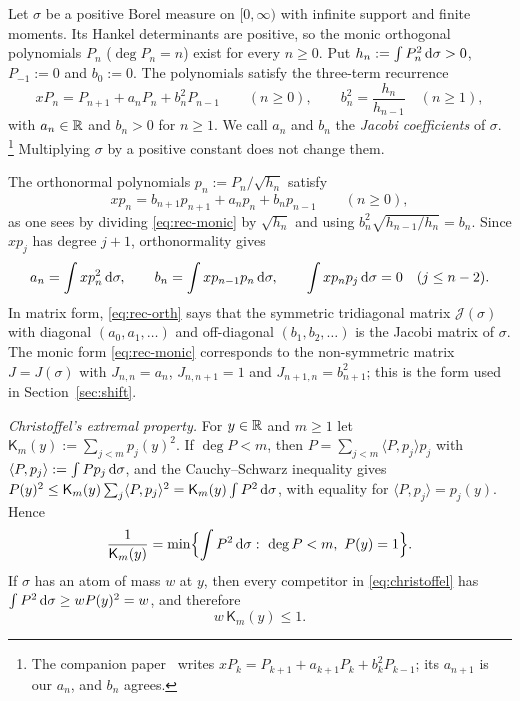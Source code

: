 Let $\sigma$ be a positive Borel measure on $[0,\infty)$ with infinite support and finite moments. Its Hankel
determinants are positive, so the monic orthogonal polynomials $P_n$ ($\deg P_n=n$) exist for every $n\ge0$. Put
$h_n:=\int P_n^2\,\mathrm{d}\sigma>0$, $P_{-1}:=0$ and $b_0:=0$. The polynomials satisfy the three-term recurrence
\begin{equation}\label{eq:rec-monic}
  xP_n=P_{n+1}+a_nP_n+b_n^2P_{n-1}\qquad(n\ge0),\qquad b_n^2=\frac{h_n}{h_{n-1}}\quad(n\ge1),
\end{equation}
with $a_n\in\mathbb{R}$ and $b_n>0$ for $n\ge1$. We call $a_n$ and $b_n$ the \emph{Jacobi coefficients} of $\sigma$.%
\footnote{The companion paper~\cite{Paper1} writes $xP_k=P_{k+1}+a_{k+1}P_k+b_k^2P_{k-1}$; its $a_{n+1}$ is our $a_n$, and $b_n$
agrees.}
Multiplying $\sigma$ by a positive constant does not change them.

The orthonormal polynomials $p_n:=P_n/\sqrt{h_n}$ satisfy
\begin{equation}\label{eq:rec-orth}
  xp_n=b_{n+1}p_{n+1}+a_np_n+b_np_{n-1}\qquad(n\ge0),
\end{equation}
as one sees by dividing \eqref{eq:rec-monic} by $\sqrt{h_n}$ and using $b_n^2\sqrt{h_{n-1}/h_n}=b_n$. Since $xp_j$ has
degree $j+1$, orthonormality gives
\begin{equation}\label{eq:coef-int}
  a_n=\int xp_n^2\,\mathrm{d}\sigma,\qquad b_n=\int xp_{n-1}p_n\,\mathrm{d}\sigma,\qquad \int xp_np_j\,\mathrm{d}\sigma=0\quad(j\le n-2).
\end{equation}
In matrix form, \eqref{eq:rec-orth} says that the symmetric tridiagonal matrix $\mathcal J(\sigma)$ with diagonal
$(a_0,a_1,\dots)$ and off-diagonal $(b_1,b_2,\dots)$ is the Jacobi matrix of $\sigma$. The monic form
\eqref{eq:rec-monic} corresponds to the non-symmetric matrix $J=J(\sigma)$ with $J_{n,n}=a_n$, $J_{n,n+1}=1$ and
$J_{n+1,n}=b_{n+1}^2$; this is the form used in Section~\ref{sec:shift}.

\emph{Christoffel's extremal property.} For $y\in\mathbb{R}$ and $m\ge1$ let $\mathsf K_m(y):=\sum_{j<m}p_j(y)^2$. If $\deg P<m$,
then $P=\sum_{j<m}\langle P,p_j\rangle p_j$ with $\langle P,p_j\rangle:=\int Pp_j\,\mathrm{d}\sigma$, and the Cauchy--Schwarz
inequality gives $P(y)^2\le\mathsf K_m(y)\sum_j\langle P,p_j\rangle^2=\mathsf K_m(y)\int P^2\,\mathrm{d}\sigma$, with equality
for $\langle P,p_j\rangle=p_j(y)$. Hence
\begin{equation}\label{eq:christoffel}
  \frac1{\mathsf K_m(y)}=\min\Bigl\{\int P^2\diff\sigma:\ \deg P<m,\ P(y)=1\Bigr\}.
\end{equation}
If $\sigma$ has an atom of mass $w$ at $y$, then every competitor in \eqref{eq:christoffel} has
$\int P^2\,\mathrm{d}\sigma\ge wP(y)^2=w$, and therefore
\begin{equation}\label{eq:Kn-le-1}
  w\,\mathsf K_m(y)\le1 .
\end{equation}

